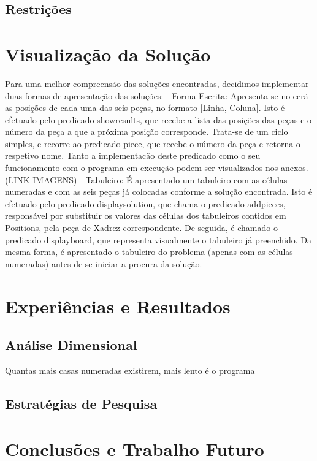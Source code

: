 \documentclass[runningheads]{llncs}
\begin{document}
\subsection{Restrições}

\section{Visualização da Solução}

Para uma melhor compreensão das soluções encontradas, decidimos implementar duas formas de apresentação das soluções:
 - Forma Escrita:
    Apresenta-se no ecrã as posições de cada uma das seis peças, no formato [Linha, Coluna].
    Isto é efetuado pelo predicado show\textunderscore results, que recebe a lista das posições das peças e o número da peça a que a próxima posição corresponde. Trata-se de um ciclo simples, e recorre ao predicado piece, que recebe o número da peça e retorna o respetivo nome.
    Tanto a implementacão deste predicado como o seu funcionamento com o programa em execução podem ser visualizados nos anexos. (LINK IMAGENS)
 - Tabuleiro:
    É apresentado um tabuleiro com as células numeradas e com as seis peças já colocadas conforme a solução encontrada.
    Isto é efetuado pelo predicado display\textunderscore solution, que chama o predicado add\textunderscore pieces, responsável por substituir os valores das células dos tabuleiros contidos em Positions, pela peça de Xadrez correspondente. De seguida, é chamado o predicado display\textunderscore board, que representa visualmente o tabuleiro já preenchido.
    Da mesma forma, é apresentado o tabuleiro do problema (apenas com as células numeradas) antes de se iniciar a procura da solução.

\section{Experiências e Resultados}
\subsection{Análise Dimensional}
Quantas mais casas numeradas existirem, mais lento é o programa
\subsection{Estratégias de Pesquisa}

\section{Conclusões e Trabalho Futuro}
\end{document}
